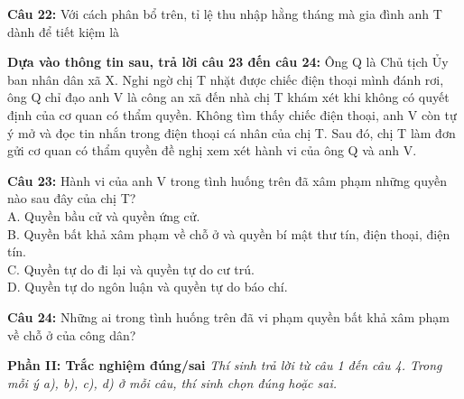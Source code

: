 \documentclass[12pt,a4paper]{article}
\begin{document}
\noindent \textbf{Câu 22:} Với cách phân bổ trên, tỉ lệ thu nhập hằng tháng mà gia đình anh T dành để tiết kiệm là\\
\noindent{}

\noindent \textbf{Dựa vào thông tin sau, trả lời câu 23 đến câu 24:} Ông Q là Chủ tịch Ủy ban nhân dân xã X. Nghi ngờ chị T nhặt được chiếc điện thoại mình đánh rơi, ông Q chỉ đạo anh V là công an xã đến nhà chị T khám xét khi không có quyết định của cơ quan có thẩm quyền. Không tìm thấy chiếc điện thoại, anh V còn tự ý mở và đọc tin nhắn trong điện thoại cá nhân của chị T. Sau đó, chị T làm đơn gửi cơ quan có thẩm quyền đề nghị xem xét hành vi của ông Q và anh V.

\noindent \textbf{Câu 23:} Hành vi của anh V trong tình huống trên đã xâm phạm những quyền nào sau đây của chị T?\\
\noindent A. Quyền bầu cử và quyền ứng cử.\\
\noindent B. Quyền bất khả xâm phạm về chỗ ở và quyền bí mật thư tín, điện thoại, điện tín.\\
\noindent C. Quyền tự do đi lại và quyền tự do cư trú.\\
\noindent D. Quyền tự do ngôn luận và quyền tự do báo chí.

\noindent \textbf{Câu 24:} Những ai trong tình huống trên đã vi phạm quyền bất khả xâm phạm về chỗ ở của công dân?\\
\noindent{}

\vspace{0.5cm}
\textbf{Phần II: Trắc nghiệm đúng/sai} \textit{Thí sinh trả lời từ câu 1 đến câu 4. Trong mỗi ý a), b), c), d) ở mỗi câu, thí sinh chọn đúng hoặc sai.}
\end{document}

